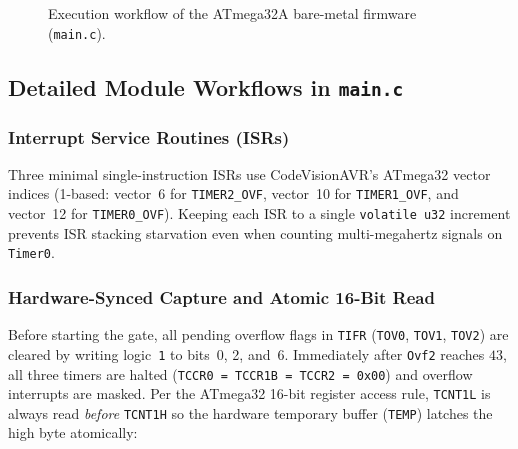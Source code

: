 \documentclass[11pt,a4paper]{article}
\begin{document}
\begin{figure}[H]
\caption{Execution workflow of the ATmega32A bare-metal firmware (\texttt{main.c}).}
\label{fig:fw_flowchart}
\end{figure}

\subsection{Detailed Module Workflows in \texttt{main.c}}

\subsubsection{Interrupt Service Routines (ISRs)}
Three minimal single-instruction ISRs use CodeVisionAVR's ATmega32 vector indices (1-based: vector~6 for \texttt{TIMER2\_OVF}, vector~10 for \texttt{TIMER1\_OVF}, and vector~12 for \texttt{TIMER0\_OVF}). Keeping each ISR to a single \texttt{volatile u32} increment prevents ISR stacking starvation even when counting multi-megahertz signals on \texttt{Timer0}.

\subsubsection{Hardware-Synced Capture and Atomic 16-Bit Read}
Before starting the gate, all pending overflow flags in \texttt{TIFR} (\texttt{TOV0}, \texttt{TOV1}, \texttt{TOV2}) are cleared by writing logic~\texttt{1} to bits~0, 2, and~6. Immediately after \texttt{Ovf2} reaches $43$, all three timers are halted (\texttt{TCCR0 = TCCR1B = TCCR2 = 0x00}) and overflow interrupts are masked. Per the ATmega32 16-bit register access rule, \texttt{TCNT1L} is always read \emph{before} \texttt{TCNT1H} so the hardware temporary buffer (\texttt{TEMP}) latches the high byte atomically:
\end{document}
